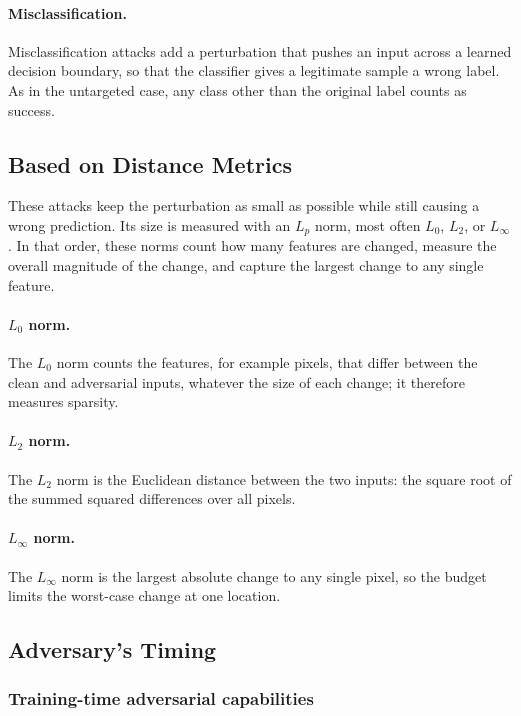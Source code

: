 \documentclass[12pt]{article}
\begin{document}
\paragraph{Misclassification.} Misclassification attacks add a perturbation that pushes an input across a learned decision boundary, so that the classifier gives a legitimate sample a wrong label. As in the untargeted case, any class other than the original label counts as success.

\subsection{Based on Distance Metrics}

These attacks keep the perturbation as small as possible while still causing a wrong prediction. Its size is measured with an $L_p$ norm, most often $L_0$, $L_2$, or $L_\infty$. In that order, these norms count how many features are changed, measure the overall magnitude of the change, and capture the largest change to any single feature.

\paragraph{$L_0$ norm.} The $L_0$ norm counts the features, for example pixels, that differ between the clean and adversarial inputs, whatever the size of each change; it therefore measures sparsity.

\paragraph{$L_2$ norm.} The $L_2$ norm is the Euclidean distance between the two inputs: the square root of the summed squared differences over all pixels.

\paragraph{$L_\infty$ norm.} The $L_\infty$ norm is the largest absolute change to any single pixel, so the budget limits the worst-case change at one location.

\subsection{Adversary's Timing}

\subsubsection{Training-time adversarial capabilities}
\end{document}

